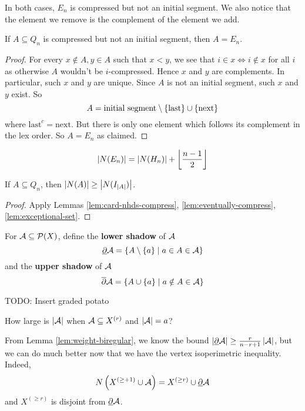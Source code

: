 \documentclass{article}
\begin{document}
In both cases, $E_n$ is compressed but not an initial segment.  We also notice that the element we remove is the complement of the element we add.

\begin{nlemma}\label{lem:exceptional-set}
  If $A \subseteq Q_n$ is compressed but not an initial segment, then $A = E_n$.
\end{nlemma}
\begin{proof}
  For every $x \nin A, y \in A$ such that $x < y$, we see that $i \in x \iff i \nin x$ for all $i$ as otherwise $A$ wouldn't be $i$-compressed. Hence $x$ and $y$ are complements. In particular, such $x$ and $y$ are unique. Since $A$ is not an initial segment, such $x$ and $y$ exist. So
  $$A = \text{initial segment} \setminus \{\text{last}\} \cup \{\text{next}\}$$
  where $\text{last}^c = \text{next}$. But there is only one element which follows its complement in the lex order. So $A = E_n$ as claimed.
\end{proof}

\begin{rmk}
  $$\left\lvert N(E_n)\right\rvert = \left\lvert N(H_n)\right\rvert + \left\lfloor \frac{n - 1}2\right\rfloor$$
\end{rmk}

\begin{nthm}
  If $A \subseteq Q_n$, then $\left\lvert N(A)\right\rvert \ge \left\lvert N(I_{\left\lvert A\right\rvert})\right\rvert$.
\end{nthm}
\begin{proof}
  Apply Lemmas \ref{lem:card-nhds-compress}, \ref{lem:eventually-compress}, \ref{lem:exceptional-set}.
\end{proof}

\begin{defi}
  For $\mathcal A \subseteq \mathcal P(X)$, define the {\bf lower shadow} of $\mathcal A$
  $$\underline\partial\mathcal A = \{A \setminus \{a\} \mid a \in A \in \mathcal A\}$$
  and the {\bf upper shadow} of $\mathcal A$
  $$\overline\partial\mathcal A = \{A \cup \{a\} \mid a \notin A \in \mathcal A\}$$
\end{defi}

TODO: Insert graded potato

\begin{question}
  How large is $\left\lvert \mathcal A\right\rvert$ when $\mathcal A \subseteq X^{(r)}$ and $\left\lvert \mathcal A\right\rvert = a$?
\end{question}

From Lemma \ref{lem:weight-biregular}, we know the bound $\left\lvert \underline\partial\mathcal A\right\rvert \ge \frac r{n - r + 1}\left\lvert \mathcal A\right\rvert$, but we can do much better now that we have the vertex isoperimetric inequality. Indeed,
$$N\left(X^{(\ge + 1)} \cup \mathcal A\right) = X^{(\ge r)} \cup \underline\partial\mathcal A$$
and $X^{(\ge r)}$ is disjoint from $\underline\partial\mathcal A$.
\end{document}
